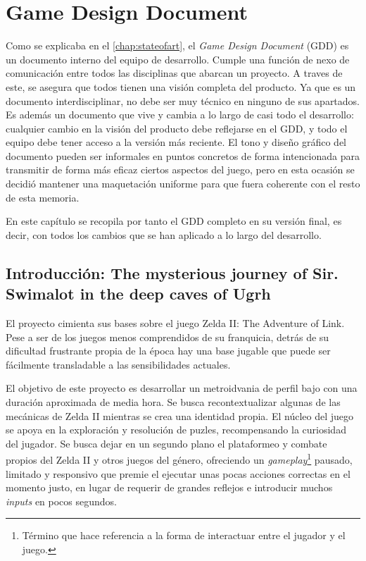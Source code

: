 \chapter{Game Design Document}
\label{chap:gdd}

Como se explicaba en el \autoref{chap:stateofart}, el \textit{Game Design Document} (GDD) es un documento interno del equipo de desarrollo. Cumple una función de nexo de comunicación entre todos las disciplinas que abarcan un proyecto. A traves de este, se asegura que todos tienen una visión completa del producto. Ya que es un documento interdisciplinar, no debe ser muy técnico en ninguno de sus apartados. Es además un documento que vive y cambia a lo largo de casi todo el desarrollo: cualquier cambio en la visión del producto debe reflejarse en el GDD, y todo el equipo debe tener acceso a la versión más reciente. El tono y diseño gráfico del documento pueden ser informales en puntos concretos de forma intencionada para transmitir de forma más eficaz ciertos aspectos del juego, pero en esta ocasión se decidió mantener una maquetación uniforme para que fuera coherente con el resto de esta memoria.

En este capítulo se recopila por tanto el GDD completo en su versión final, es decir, con todos los cambios que se han aplicado a lo largo del desarrollo.

\section{Introducción: The mysterious journey of Sir. Swimalot in the deep caves of Ugrh}

El proyecto cimienta sus bases sobre el juego Zelda II: The Adventure of Link. Pese a ser de los juegos menos comprendidos de su franquicia, detrás de su dificultad frustrante propia de la época hay una base jugable que puede ser fácilmente transladable a las sensibilidades actuales.

El objetivo de este proyecto es desarrollar un metroidvania de perfil bajo con una duración aproximada de media hora. Se busca recontextualizar algunas de las mecánicas de Zelda II mientras se crea una identidad propia. El núcleo del juego se apoya en la exploración y resolución de puzles, recompensando la curiosidad del jugador. Se busca dejar en un segundo plano el plataformeo y combate propios del Zelda II y otros juegos del género, ofreciendo un \textit{gameplay}\footnote{Término que hace referencia a la forma de interactuar entre el jugador y el juego.} pausado, limitado y responsivo que premie el ejecutar unas pocas acciones correctas en el momento justo, en lugar de requerir de grandes reflejos e introducir muchos \textit{inputs} en pocos segundos. 

